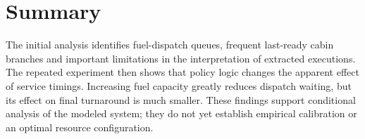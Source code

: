 \section{Summary}
The initial analysis identifies fuel-dispatch queues, frequent last-ready cabin branches and important limitations in the interpretation of extracted executions. The repeated experiment then shows that policy logic changes the apparent effect of service timings. Increasing fuel capacity greatly reduces dispatch waiting, but its effect on final turnaround is much smaller. These findings support conditional analysis of the modeled system; they do not yet establish empirical calibration or an optimal resource configuration.
